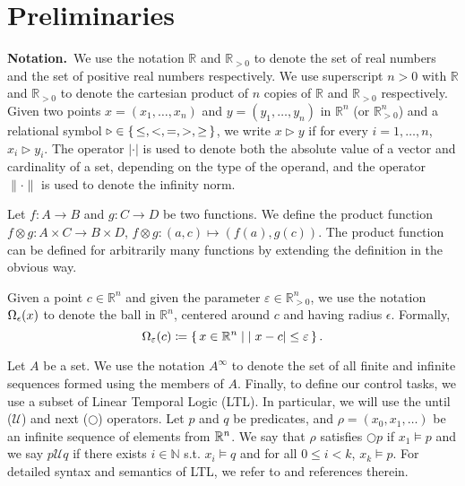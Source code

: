 
\section{Preliminaries}

\smallskip
\noindent\textbf{Notation.}\
We use the notation $\mathbb{R}$ and $\mathbb{R}_{>0}$ to denote the set of real numbers and the set of positive real numbers respectively.
We use superscript $n>0$ with $\mathbb{R}$ and $\mathbb{R}_{>0}$ to denote the cartesian product of $n$ copies of $\mathbb{R}$ and $\mathbb{R}_{>0}$ respectively.
Given two points $x=(x_1,\ldots, x_n)$ and $y=(y_1,\ldots, y_n)$ in $ \mathbb{R}^n$ (or $\mathbb{R}^n_{>0}$) and a relational symbol $\triangleright\in \set{\leq, <, = , >, \geq}$, we write $x\triangleright y$ if for every $i=1,\ldots,n$, $x_i\triangleright y_i$.
The operator $|\cdot |$ is used to denote both the absolute value of a vector and cardinality of a set, depending on the type of the operand, and the operator $\| \cdot \|$ is used to denote the infinity norm.  

Let $f\colon A\to B$ and $g\colon C\to D$ be two functions.
We define the product function $f\otimes g\colon A\times C\to B\times D $, $f\otimes g \colon (a,c)\mapsto (f(a),g(c))$.
The product function can be defined for arbitrarily many functions by extending the definition in the obvious way.

Given a point $c\in \mathbb{R}^n$ and given the parameter $\varepsilon\in \mathbb{R}_{>0}^{n}$, we use the notation $\Omega_\epsilon( x)$ to denote the ball in $\mathbb{R}^n$, centered around $c$ and having radius $\epsilon$.
Formally, \[\Omega_\varepsilon(c)\coloneqq \set{x
	\in \mathbb{R}^n \mid  |x-c|\leq \varepsilon }.\] 

Let $A$ be a set.
We use the notation $A^\infty$ to denote the set of all finite and infinite sequences formed using the members of $A$. Finally, to define our control tasks, we use a subset of Linear Temporal Logic (LTL). In particular, we will use the until ($\mathcal{U}$) and next  ($\bigcirc$) operators. Let $p$ and $q$ be predicates, and $\rho=(x_0,x_1,\dots)$ be an infinite sequence of elements from $\mathbb{R}^n$. We say that $\rho$ satisfies $\bigcirc p$ if $x_1\models p$ and we say $p\mathcal{U}q$ if there exists $i\in\mathbb{N}$ s.t. $x_i\models q$ and for all $0\leq i<k$, $x_k\models p$. For detailed syntax and semantics of LTL, we refer to \cite{baier2008principles} and references therein.

